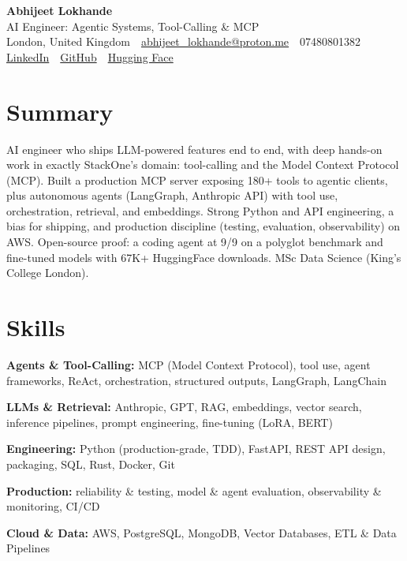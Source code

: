 \documentclass[10pt,a4paper]{article}
\newcommand{\sep}{\,\textcolor{accent!60}{\textbar}\,}
\begin{document}
\begin{center}
  {\fontsize{24}{26}\selectfont\bfseries Abhijeet Lokhande}\\[3pt]
  {\color{accent}\large AI Engineer: Agentic Systems, Tool-Calling \& MCP}\\[5pt]
  {\small
    London, United Kingdom \sep
    \href{mailto:abhijeet_lokhande@proton.me}{abhijeet\_lokhande@proton.me} \sep
    07480801382 \\[2pt]
    \href{https://www.linkedin.com/in/ablds/}{LinkedIn} \sep
    \href{https://github.com/abhijeetscode}{GitHub} \sep
    \href{https://huggingface.co/ab-ai}{Hugging Face}
  }
\end{center}
\vspace{2pt}

\section{Summary}
AI engineer who ships LLM-powered features end to end, with deep hands-on work in exactly StackOne's domain: tool-calling and the Model Context Protocol (MCP). Built a production MCP server exposing 180+ tools to agentic clients, plus autonomous agents (LangGraph, Anthropic API) with tool use, orchestration, retrieval, and embeddings. Strong Python and API engineering, a bias for shipping, and production discipline (testing, evaluation, observability) on AWS. Open-source proof: a coding agent at 9/9 on a polyglot benchmark and fine-tuned models with 67K+ HuggingFace downloads. MSc Data Science (King's College London).

\section{Skills}
\begin{tight}
  \item[\textcolor{accent}{\small$\bullet$}] \textbf{Agents \& Tool-Calling:} MCP (Model Context Protocol), tool use, agent frameworks, ReAct, orchestration, structured outputs, LangGraph, LangChain
  \item[\textcolor{accent}{\small$\bullet$}] \textbf{LLMs \& Retrieval:} Anthropic, GPT, RAG, embeddings, vector search, inference pipelines, prompt engineering, fine-tuning (LoRA, BERT)
  \item[\textcolor{accent}{\small$\bullet$}] \textbf{Engineering:} Python (production-grade, TDD), FastAPI, REST API design, packaging, SQL, Rust, Docker, Git
  \item[\textcolor{accent}{\small$\bullet$}] \textbf{Production:} reliability \& testing, model \& agent evaluation, observability \& monitoring, CI/CD
  \item[\textcolor{accent}{\small$\bullet$}] \textbf{Cloud \& Data:} AWS, PostgreSQL, MongoDB, Vector Databases, ETL \& Data Pipelines
\end{tight}
\end{document}

